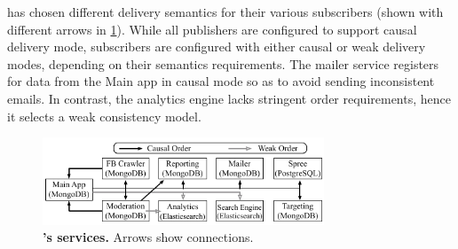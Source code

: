 \crowdtap has chosen different delivery semantics for their various subscribers
(shown with different arrows in \F\ref{synapse:fig:crowdtap-ecosystem}). While all
publishers are configured to support causal delivery mode, subscribers are
configured with either causal or weak delivery modes, depending on their
semantics requirements. The mailer service registers for data from
the Main app in causal mode so as to avoid sending inconsistent emails.
In contrast, the analytics engine lacks stringent order
requirements, hence it selects  a weak consistency model.

\begin{figure}[t]
\centering
   \includegraphics[width=3.3in]{figures/synapse/eco-crowdtap.pdf}
      \vspace{-20pt}
   \caption{\textbf{\crowdtap's services.} Arrows show \synapse connections.}
   \label{synapse:fig:crowdtap-ecosystem}
\end{figure}

